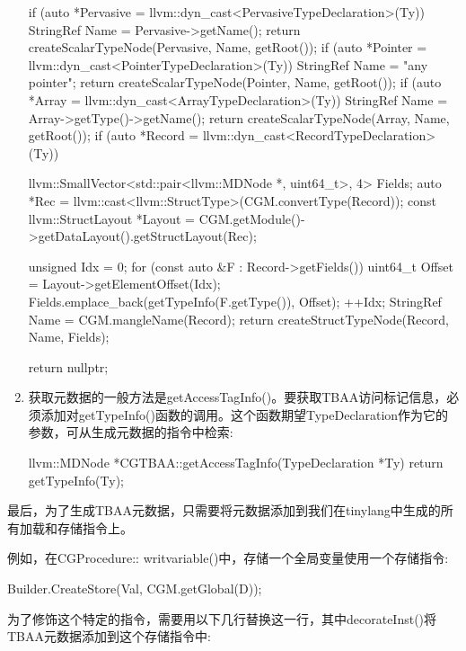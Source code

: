 \begin{enumerate}
\begin{cpp}
{    if (auto *Pervasive =
            llvm::dyn_cast<PervasiveTypeDeclaration>(Ty)) {
        StringRef Name = Pervasive->getName();
        return createScalarTypeNode(Pervasive, Name, getRoot());
    }
    if (auto *Pointer =
            llvm::dyn_cast<PointerTypeDeclaration>(Ty)) {
        StringRef Name = "any pointer";
        return createScalarTypeNode(Pointer, Name, getRoot());
    }
    if (auto *Array =
            llvm::dyn_cast<ArrayTypeDeclaration>(Ty)) {
        StringRef Name = Array->getType()->getName();
        return createScalarTypeNode(Array, Name, getRoot());
    }
    if (auto *Record =
            llvm::dyn_cast<RecordTypeDeclaration>(Ty)) {
        llvm::SmallVector<std::pair<llvm::MDNode *, uint64_t>,
        4> Fields;
        auto *Rec =
            llvm::cast<llvm::StructType>(CGM.convertType(Record));
        const llvm::StructLayout *Layout =
        CGM.getModule()->getDataLayout().getStructLayout(Rec);

        unsigned Idx = 0;
        for (const auto &F : Record->getFields()) {
            uint64_t Offset = Layout->getElementOffset(Idx);
            Fields.emplace_back(getTypeInfo(F.getType()), Offset);
            ++Idx;
        }
        StringRef Name = CGM.mangleName(Record);
        return createStructTypeNode(Record, Name, Fields);
    }
    return nullptr;
}
\end{cpp}

\item
获取元数据的一般方法是getAccessTagInfo()。要获取TBAA访问标记信息，必须添加对getTypeInfo()函数的调用。这个函数期望TypeDeclaration作为它的参数，可从生成元数据的指令中检索:

\begin{cpp}
llvm::MDNode *CGTBAA::getAccessTagInfo(TypeDeclaration *Ty) {
    return getTypeInfo(Ty);
}
\end{cpp}

\end{enumerate}

最后，为了生成TBAA元数据，只需要将元数据添加到我们在tinylang中生成的所有加载和存储指令上。

例如，在CGProcedure:: writvariable()中，存储一个全局变量使用一个存储指令:

\begin{cpp}
    Builder.CreateStore(Val, CGM.getGlobal(D));
\end{cpp}

为了修饰这个特定的指令，需要用以下几行替换这一行，其中decorateInst()将TBAA元数据添加到这个存储指令中:

